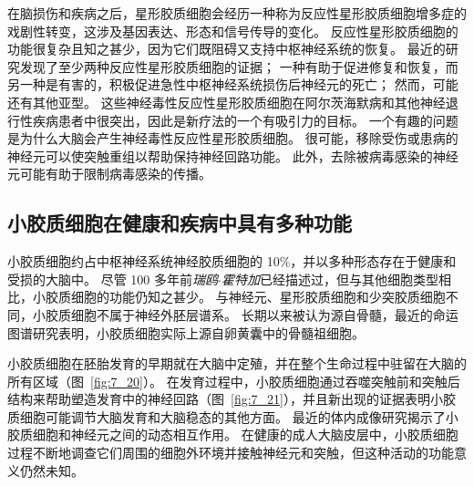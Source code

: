 在脑损伤和疾病之后，星形胶质细胞会经历一种称为反应性星形胶质细胞增多症的戏剧性转变，这涉及基因表达、形态和信号传导的变化。
反应性星形胶质细胞的功能很复杂且知之甚少，因为它们既阻碍又支持中枢神经系统的恢复。
最近的研究发现了至少两种反应性星形胶质细胞的证据；
一种有助于促进修复和恢复，而另一种是有害的，积极促进急性中枢神经系统损伤后神经元的死亡；
然而，可能还有其他亚型。
这些神经毒性反应性星形胶质细胞在阿尔茨海默病和其他神经退行性疾病患者中很突出，因此是新疗法的一个有吸引力的目标。
一个有趣的问题是为什么大脑会产生神经毒性反应性星形胶质细胞。
很可能，移除受伤或患病的神经元可以使突触重组以帮助保持神经回路功能。
此外，去除被病毒感染的神经元可能有助于限制病毒感染的传播。


\subsection{小胶质细胞在健康和疾病中具有多种功能}

小胶质细胞约占中枢神经系统神经胶质细胞的 10\%，并以多种形态存在于健康和受损的大脑中。
尽管 100 多年前\textit{瑞鸥$\cdot$霍特加}已经描述过，但与其他细胞类型相比，小胶质细胞的功能仍知之甚少。
与神经元、星形胶质细胞和少突胶质细胞不同，小胶质细胞不属于神经外胚层谱系。
长期以来被认为源自骨髓，最近的命运图谱研究表明，小胶质细胞实际上源自卵黄囊中的骨髓祖细胞。


小胶质细胞在胚胎发育的早期就在大脑中定殖，并在整个生命过程中驻留在大脑的所有区域（图~\ref{fig:7_20}）。
在发育过程中，小胶质细胞通过吞噬突触前和突触后结构来帮助塑造发育中的神经回路（图~\ref{fig:7_21}），并且新出现的证据表明小胶质细胞可能调节大脑发育和大脑稳态的其他方面。
最近的体内成像研究揭示了小胶质细胞和神经元之间的动态相互作用。
在健康的成人大脑皮层中，小胶质细胞过程不断地调查它们周围的细胞外环境并接触神经元和突触，但这种活动的功能意义仍然未知。


